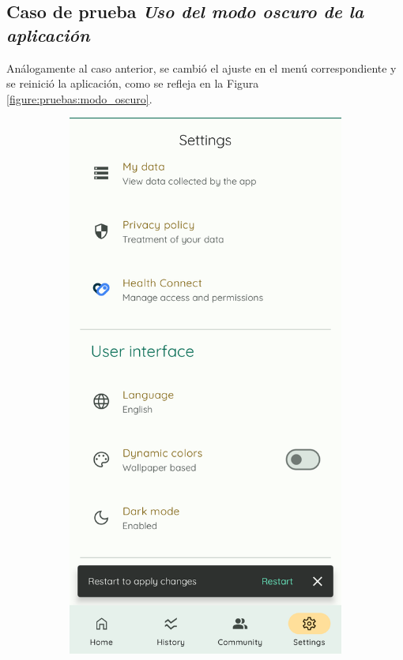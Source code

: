             \clearpage  %
        \subsection*{Caso de prueba \textit{Uso del modo oscuro de la aplicación}}

            Análogamente al caso anterior, se cambió el ajuste en el menú correspondiente y se reinició la aplicación, como se refleja en la Figura \ref{figure:pruebas:modo_oscuro}.

            \begin{figure}[htbp]
                \centering
                \begin{subfigure}[c]{0.4\textwidth}
                    \centering
                    \includegraphics[width=1\textwidth]{figures/pruebas/modo_oscuro/Antes.png}

\end{subfigure}
\end{figure}
